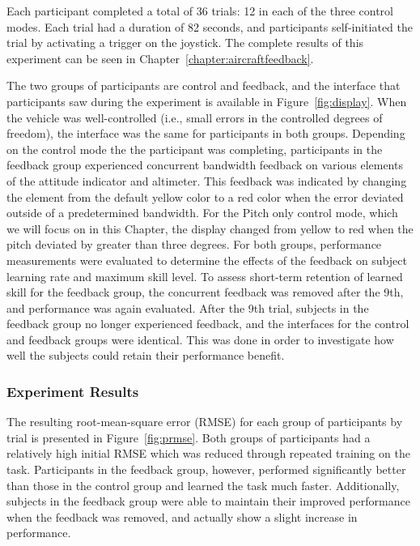 Each participant completed a total of 36 trials: 12 in each of the three control modes.
Each trial had a duration of 82 seconds, and participants self-initiated the trial by activating a trigger on the joystick.
The complete results of this experiment can be seen in Chapter~\ref{chapter:aircraftfeedback}.

The two groups of participants are control and feedback, and the interface that participants saw during the experiment is available in Figure~\ref{fig:display}.
When the vehicle was well-controlled (i.e., small errors in the controlled degrees of freedom), the interface was the same for participants in both groups.
Depending on the control mode the the participant was completing, participants in the feedback group experienced concurrent bandwidth feedback on various elements of the attitude indicator and altimeter.
This feedback was indicated by changing the element from the default yellow color to a red color when the error deviated outside of a predetermined bandwidth.
For the Pitch only control mode, which we will focus on in this Chapter, the display changed from yellow to red when the pitch deviated by greater than three degrees.
For both groups, performance measurements were evaluated to determine the effects of the feedback on subject learning rate and maximum skill level.
To assess short-term retention of learned skill for the feedback group, the concurrent feedback was removed after the 9th, and performance was again evaluated.
After the 9th trial, subjects in the feedback group no longer experienced feedback, and the interfaces for the control and feedback groups were identical.
This was done in order to investigate how well the subjects could retain their performance benefit.

\subsubsection{Experiment Results}
The resulting root-mean-square error (RMSE) for each group of participants by trial is presented in Figure~\ref{fig:prmse}.
Both groups of participants had a relatively high initial RMSE which was reduced through repeated training on the task.
Participants in the feedback group, however, performed significantly better than those in the control group and learned the task much faster.
Additionally, subjects in the feedback group were able to maintain their improved performance when the feedback was removed, and actually show a slight increase in performance.

